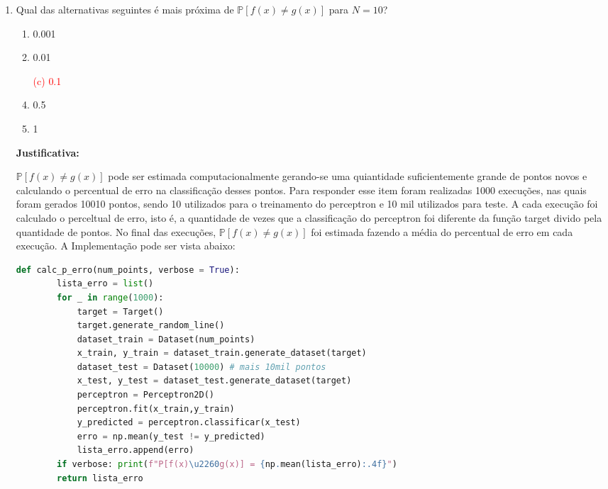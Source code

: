 \begin{enumerate}
    \item Qual das alternativas seguintes é mais próxima de $\mathbb{P}[f(x) \neq g(x)]$ para $N = 10$?
    
    \begin{enumerate}
        \item 0.001
        \item 0.01
        \item[\textcolor{red}{(c)}]\textcolor{red}{0.1}\addtocounter{enumii}{1}
        \item 0.5
        \item 1
    \end{enumerate}
     
    \par

    \textbf{Justificativa:}
     
    $\mathbb{P}[f(x) \neq g(x)]$ pode ser estimada computacionalmente gerando-se uma quiantidade suficientemente grande de pontos novos e calculando o percentual de erro na classificação desses pontos. Para responder esse item foram realizadas 1000 execuções, nas quais foram gerados 10010 pontos, sendo 10 utilizados para o treinamento do perceptron e 10 mil utilizados para teste. A cada execução foi calculado o perceltual de erro, isto é, a quantidade de vezes que a classificação do perceptron foi diferente da função target divido pela quantidade de pontos. No final das execuções, $\mathbb{P}[f(x) \neq g(x)]$ foi estimada fazendo a média do percentual de erro em cada execução. A Implementação pode ser vista abaixo:

    \begin{lstlisting}[language=Python, caption=Cálculo da probabilidade de erro, label=cod:perceptron_p_erro]
        def calc_p_erro(num_points, verbose = True):
        lista_erro = list()
        for _ in range(1000):
            target = Target()
            target.generate_random_line()
            dataset_train = Dataset(num_points)
            x_train, y_train = dataset_train.generate_dataset(target)
            dataset_test = Dataset(10000) # mais 10mil pontos
            x_test, y_test = dataset_test.generate_dataset(target)
            perceptron = Perceptron2D()
            perceptron.fit(x_train,y_train)
            y_predicted = perceptron.classificar(x_test)
            erro = np.mean(y_test != y_predicted)
            lista_erro.append(erro)
        if verbose: print(f"P[f(x)\u2260g(x)] = {np.mean(lista_erro):.4f}")
        return lista_erro
    \end{lstlisting}


\end{enumerate}
